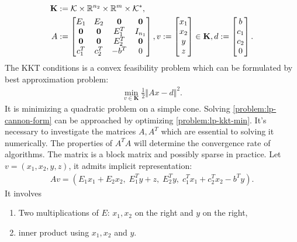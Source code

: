 \documentclass[12pt]{report}
\begin{document}
        \begin{align*}
            \mathbf K &:= \mathcal K \times \mathbb R^{n_2} \times \mathbb R^m \times \mathcal K^*, 
            \\
            A &:= \begin{bmatrix}
                E_1 & E_2 & \mathbf 0 & \mathbf 0
                \\
                \mathbf 0 &\mathbf 0  & E_1^T & I_{n_1}
                \\
                \mathbf 0 &\mathbf 0  & E_2^T & \mathbf 0
                \\
                c_1^T & c_2^T & - b^T & 0
            \end{bmatrix}, 
            v := 
            \begin{bmatrix}
                x_1\\ x_2 \\ y \\ z \\
            \end{bmatrix} \in \mathbf K, 
            d := 
            \begin{bmatrix}
                b \\ c_1 \\ c_2 \\ 0
            \end{bmatrix}. 
        \end{align*}
        The KKT conditions is a convex feasibility problem which can be formulated by best approximation problem: 
        \begin{align}\label{problem:lp-kkt-min}
            \min_{v \in \mathbf K} 
            \frac{1}{2}\Vert Ax - d \Vert^2. 
        \end{align}
        It is minimizing a quadratic problem on a simple cone. 
        Solving \eqref{problem:lp-cannon-form} can be approached by optimizing \eqref{problem:lp-kkt-min}. 
        It's necessary to investigate the matrices $A, A^T$ which are essential to solving it numerically. 
        The properties of $A^TA$ will determine the convergence rate of algorithms. 
        The matrix is a block matrix and possibly sparse in practice. 
        Let $v = (x_1, x_2, y, z)$, it admits implicit representation: 
        \begin{align*}
            Av = (E_1x_1 + E_2 x_2,\; E_1^Ty + z,\; E_2^Ty,\; c^T_1x_1 + c_2^Tx_2 - b^Ty). 
        \end{align*}
        It involves 
        \begin{enumerate}
            \item Two multiplications of $E$: $x_1, x_2$ on the right and $y$ on the right,  
            \item inner product using $x_1, x_2$ and $y$. 
        \end{enumerate}
\end{document}
